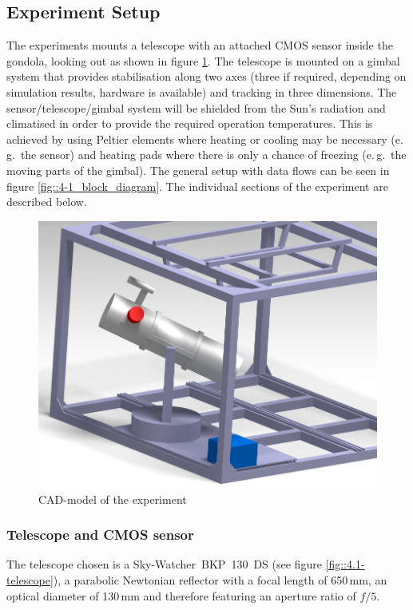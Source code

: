 \subsection{Experiment Setup} \label{Experiment_Setup}




The experiments mounts a telescope with an attached CMOS sensor inside the gondola, looking out as shown in figure \ref{fig::4-1_CAD}. The telescope is mounted on a gimbal system that provides stabilisation along two axes (three if required, depending on simulation results, hardware is available) and tracking in three dimensions. The sensor/telescope/gimbal system will be shielded from the Sun's radiation and climatised in order to provide the required operation temperatures. This is achieved by using Peltier elements where heating or cooling may be necessary (e.\,g.~the sensor) and heating pads where there is only a chance of freezing (e.\,g.~the moving parts of the gimbal). The general setup with data flows can be seen in figure \ref{fig::4-1_block_diagram}. The individual sections of the experiment are described below.

\begin{figure}[h]
	\centering
	\includegraphics[width=0.7\linewidth]{4-experiment-design/img/setup/Assembly_3}
	\caption{CAD-model of the experiment}
	\label{fig::4-1_CAD}
\end{figure}


\subsubsection{Telescope and CMOS sensor}
The telescope chosen is a Sky-Watcher~BKP~130~DS (see figure \ref{fig::4.1-telescope}), a parabolic Newtonian reflector with a focal length of 650\,mm, an optical diameter of 130\,mm and therefore featuring an aperture ratio of $f/5$. 

